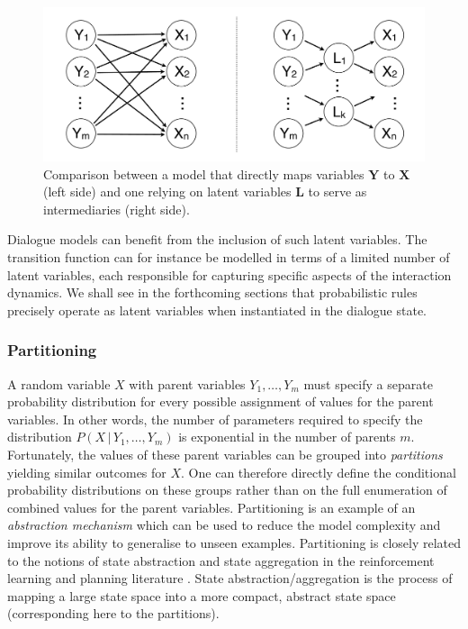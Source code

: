  \begin{figure}[ht]
\centering
\includegraphics[scale=0.25]{imgs/latentvariables.pdf}
\caption{Comparison between a model that directly maps variables $\mathbf{Y}$ to $\mathbf{X}$ (left side) and one relying on latent variables $\mathbf{L}$ to serve as intermediaries (right side).}
\label{fig:latentvariables}
\end{figure}

Dialogue models can benefit from the inclusion of such latent variables. The transition function can for instance be modelled in terms of a limited number of latent variables, each responsible for capturing specific aspects of the interaction dynamics.  We shall see in the forthcoming sections that probabilistic rules precisely operate as latent variables when instantiated in the dialogue state. 

\subsubsection*{Partitioning}
A random variable $X$ with parent variables $Y_1,\dots, Y_m$ must specify a separate probability distribution for every possible assignment of values for the parent variables. In other words, the number of parameters required to specify the distribution $P(X \, | \, Y_1, \dots, Y_m)$ is exponential in the number of parents $m$. Fortunately, the values of these parent variables can be grouped into \textit{partitions} yielding similar outcomes for $X$. One can therefore directly define the conditional probability distributions on these groups rather than on the full enumeration of combined values for the parent variables. Partitioning is an example of an \textit{abstraction mechanism} which can be used to reduce the model complexity and improve its ability to generalise to unseen examples. Partitioning is closely related to the notions of state abstraction and state aggregation in the reinforcement learning and planning literature \citep{conf/isaim/LiWL06}.  State abstraction/aggregation is the process of mapping a large state space into a more compact, abstract state space (corresponding here to the partitions).

